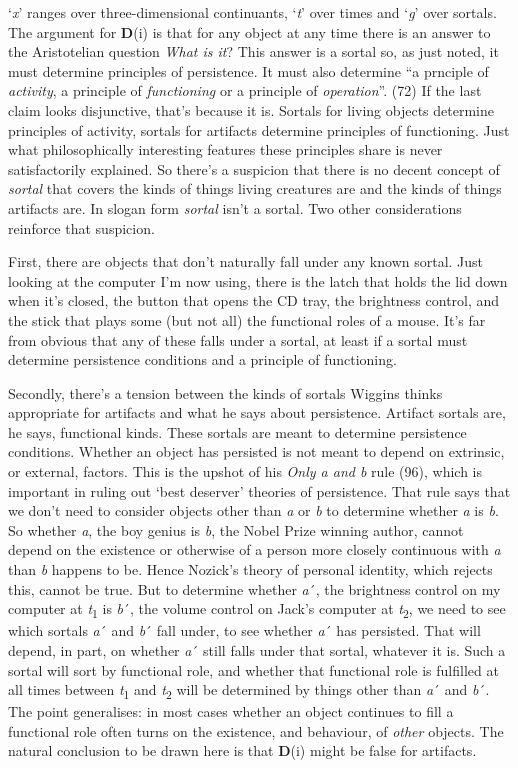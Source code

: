 \documentclass[
  10pt,
  letterpaper,
  DIV=11,
  numbers=noendperiod,
  twoside]{scrartcl}
\begin{document}
`\emph{x}' ranges over three-dimensional continuants, `\emph{t}' over
times and `\emph{g}' over sortals. The argument for \textbf{D}(i) is
that for any object at any time there is an answer to the Aristotelian
question \emph{What is it}? This answer is a sortal so, as just noted,
it must determine principles of persistence. It must also determine ``a
prnciple of \emph{activity}, a principle of \emph{functioning} or a
principle of \emph{operation}''. (72) If the last claim looks
disjunctive, that's because it is. Sortals for living objects determine
principles of activity, sortals for artifacts determine principles of
functioning. Just what philosophically interesting features these
principles share is never satisfactorily explained. So there's a
suspicion that there is no decent concept of \emph{sortal} that covers
the kinds of things living creatures are and the kinds of things
artifacts are. In slogan form \emph{sortal} isn't a sortal. Two other
considerations reinforce that suspicion.

First, there are objects that don't naturally fall under any known
sortal. Just looking at the computer I'm now using, there is the latch
that holds the lid down when it's closed, the button that opens the CD
tray, the brightness control, and the stick that plays some (but not
all) the functional roles of a mouse. It's far from obvious that any of
these falls under a sortal, at least if a sortal must determine
persistence conditions and a principle of functioning.

Secondly, there's a tension between the kinds of sortals Wiggins thinks
appropriate for artifacts and what he says about persistence. Artifact
sortals are, he says, functional kinds. These sortals are meant to
determine persistence conditions. Whether an object has persisted is not
meant to depend on extrinsic, or external, factors. This is the upshot
of his \emph{Only a and b} rule (96), which is important in ruling out
`best deserver' theories of persistence. That rule says that we don't
need to consider objects other than \emph{a} or \emph{b} to determine
whether \emph{a} is \emph{b}. So whether \emph{a}, the boy genius is
\emph{b}, the Nobel Prize winning author, cannot depend on the existence
or otherwise of a person more closely continuous with \emph{a} than
\emph{b} happens to be. Hence Nozick's theory of personal identity,
which rejects this, cannot be true. But to determine whether \emph{a}´,
the brightness control on my computer at \emph{t}\textsubscript{1} is
\emph{b}´, the volume control on Jack's computer at
\emph{t}\textsubscript{2}, we need to see which sortals \emph{a}´ and
\emph{b}´ fall under, to see whether \emph{a}´ has persisted. That will
depend, in part, on whether \emph{a}´ still falls under that sortal,
whatever it is. Such a sortal will sort by functional role, and whether
that functional role is fulfilled at all times between
\emph{t}\textsubscript{1} and \emph{t}\textsubscript{2} will be
determined by things other than \emph{a}´ and \emph{b}´. The point
generalises: in most cases whether an object continues to fill a
functional role often turns on the existence, and behaviour, of
\emph{other} objects. The natural conclusion to be drawn here is that
\textbf{D}(i) might be false for artifacts.
\end{document}
